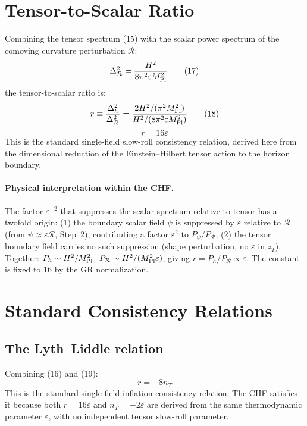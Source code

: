 \documentclass[12pt,a4paper]{article}
\begin{document}
\section{Tensor-to-Scalar Ratio}

Combining the tensor spectrum (15) with the scalar power spectrum of the comoving curvature perturbation $\mathcal{R}$:
\begin{equation}
\Delta_\mathcal{R}^2 = \frac{H^2}{8\pi^2\varepsilon M_{\rm Pl}^2} \tag{17}
\end{equation}
the tensor-to-scalar ratio is:
\begin{equation}
r \equiv \frac{\Delta_h^2}{\Delta_\mathcal{R}^2} = \frac{2H^2/(\pi^2 M_{\rm Pl}^2)}{H^2/(8\pi^2\varepsilon M_{\rm Pl}^2)} \tag{18}
\end{equation}
\begin{equation}
\boxed{r = 16\varepsilon} \tag{19}
\end{equation}
This is the standard single-field slow-roll consistency relation, derived here from the dimensional reduction of the Einstein--Hilbert tensor action to the horizon boundary.

\paragraph{Physical interpretation within the CHF.} The factor $\varepsilon^{-2}$ that suppresses the scalar spectrum relative to tensor has a twofold origin: (1) the boundary scalar field $\psi$ is suppressed by $\varepsilon$ relative to $\mathcal{R}$ (from $\psi \approx \varepsilon\mathcal{R}$, Step~2), contributing a factor $\varepsilon^2$ to $P_\psi/P_\mathcal{R}$; (2) the tensor boundary field carries no such suppression (shape perturbation, no $\varepsilon$ in $z_T$). Together: $P_h \sim H^2/M_{\rm Pl}^2$, $P_\mathcal{R} \sim H^2/(M_{\rm Pl}^2\varepsilon)$, giving $r = P_h/P_\mathcal{R} \propto \varepsilon$. The constant is fixed to $16$ by the GR normalization.

\section{Standard Consistency Relations}

\subsection{The Lyth--Liddle relation}

Combining (16) and (19):
\begin{equation}
r = -8n_T \tag{20}
\end{equation}
This is the standard single-field inflation consistency relation. The CHF satisfies it because both $r = 16\varepsilon$ and $n_T = -2\varepsilon$ are derived from the same thermodynamic parameter $\varepsilon$, with no independent tensor slow-roll parameter.
\end{document}

